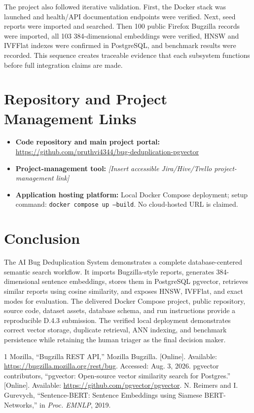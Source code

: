 \documentclass[conference]{IEEEtran}
\newcommand{\repo}{\url{https://github.com/pruthvi4344/bug-deduplication-pgvector}}
\newcommand{\pmtool}{\textit{[Insert accessible Jira/Hive/Trello project-management link]}}
\begin{document}
The project also followed iterative validation. First, the Docker stack was launched and health/API documentation endpoints were verified. Next, seed reports were imported and searched. Then 100 public Firefox Bugzilla records were imported, all 103 384-dimensional embeddings were verified, HNSW and IVFFlat indexes were confirmed in PostgreSQL, and benchmark results were recorded. This sequence creates traceable evidence that each subsystem functions before full integration claims are made.

\section{Repository and Project Management Links}\label{sec:links}
\begin{itemize}
\item \textbf{Code repository and main project portal:} \repo
\item \textbf{Project-management tool:} \pmtool
\item \textbf{Application hosting platform:} Local Docker Compose deployment; setup command: \texttt{docker compose up --build}. No cloud-hosted URL is claimed.
\end{itemize}

\section{Conclusion}
The AI Bug Deduplication System demonstrates a complete database-centered semantic search workflow. It imports Bugzilla-style reports, generates 384-dimensional sentence embeddings, stores them in PostgreSQL pgvector, retrieves similar reports using cosine similarity, and exposes HNSW, IVFFlat, and exact modes for evaluation. The delivered Docker Compose project, public repository, source code, dataset assets, database schema, and run instructions provide a reproducible D.4.3 submission. The verified local deployment demonstrates correct vector storage, duplicate retrieval, ANN indexing, and benchmark persistence while retaining the human triager as the final decision maker.

\begin{thebibliography}{1}
 Mozilla, ``Bugzilla REST API,'' Mozilla Bugzilla. [Online]. Available: \url{https://bugzilla.mozilla.org/rest/bug}. Accessed: Aug. 3, 2026.
 pgvector contributors, ``pgvector: Open-source vector similarity search for Postgres.'' [Online]. Available: \url{https://github.com/pgvector/pgvector}.
 N. Reimers and I. Gurevych, ``Sentence-BERT: Sentence Embeddings using Siamese BERT-Networks,'' in \textit{Proc. EMNLP}, 2019.
\end{thebibliography}
\end{document}
